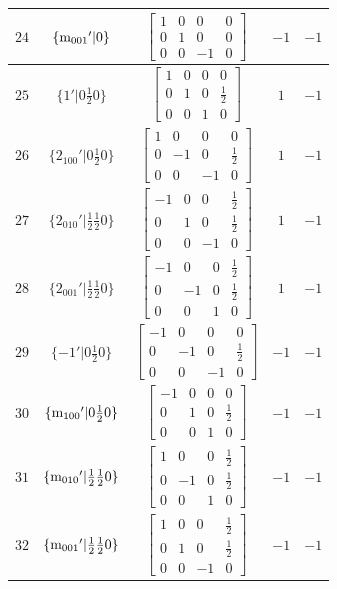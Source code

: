\documentclass[fleqn,8pt]{jsarticle}
\begin{document}
\begin{longtable}{ccccc}
$ 24 $ & $ \{{\rm m}_{001}{}'|0\} $ & $ \begin{bmatrix} 1 & 0 & 0 & 0 \\ 0 & 1 & 0 & 0 \\ 0 & 0 & -1 & 0 \end{bmatrix} $ & $ -1 $ & $ -1 $ \\ \hline
$ 25 $ & $ \{1{}'|0 \frac{1}{2} 0\} $ & $ \begin{bmatrix} 1 & 0 & 0 & 0 \\ 0 & 1 & 0 & \frac{1}{2} \\ 0 & 0 & 1 & 0 \end{bmatrix} $ & $ 1 $ & $ -1 $ \\ \hline
$ 26 $ & $ \{2{}_{100}{}'|0 \frac{1}{2} 0\} $ & $ \begin{bmatrix} 1 & 0 & 0 & 0 \\ 0 & -1 & 0 & \frac{1}{2} \\ 0 & 0 & -1 & 0 \end{bmatrix} $ & $ 1 $ & $ -1 $ \\ \hline
$ 27 $ & $ \{2{}_{010}{}'|\frac{1}{2} \frac{1}{2} 0\} $ & $ \begin{bmatrix} -1 & 0 & 0 & \frac{1}{2} \\ 0 & 1 & 0 & \frac{1}{2} \\ 0 & 0 & -1 & 0 \end{bmatrix} $ & $ 1 $ & $ -1 $ \\ \hline
$ 28 $ & $ \{2{}_{001}{}'|\frac{1}{2} \frac{1}{2} 0\} $ & $ \begin{bmatrix} -1 & 0 & 0 & \frac{1}{2} \\ 0 & -1 & 0 & \frac{1}{2} \\ 0 & 0 & 1 & 0 \end{bmatrix} $ & $ 1 $ & $ -1 $ \\ \hline
$ 29 $ & $ \{-1{}'|0 \frac{1}{2} 0\} $ & $ \begin{bmatrix} -1 & 0 & 0 & 0 \\ 0 & -1 & 0 & \frac{1}{2} \\ 0 & 0 & -1 & 0 \end{bmatrix} $ & $ -1 $ & $ -1 $ \\ \hline
$ 30 $ & $ \{{\rm m}_{100}{}'|0 \frac{1}{2} 0\} $ & $ \begin{bmatrix} -1 & 0 & 0 & 0 \\ 0 & 1 & 0 & \frac{1}{2} \\ 0 & 0 & 1 & 0 \end{bmatrix} $ & $ -1 $ & $ -1 $ \\ \hline
$ 31 $ & $ \{{\rm m}_{010}{}'|\frac{1}{2} \frac{1}{2} 0\} $ & $ \begin{bmatrix} 1 & 0 & 0 & \frac{1}{2} \\ 0 & -1 & 0 & \frac{1}{2} \\ 0 & 0 & 1 & 0 \end{bmatrix} $ & $ -1 $ & $ -1 $ \\ \hline
$ 32 $ & $ \{{\rm m}_{001}{}'|\frac{1}{2} \frac{1}{2} 0\} $ & $ \begin{bmatrix} 1 & 0 & 0 & \frac{1}{2} \\ 0 & 1 & 0 & \frac{1}{2} \\ 0 & 0 & -1 & 0 \end{bmatrix} $ & $ -1 $ & $ -1 $ \\
\end{longtable}
\end{document}

